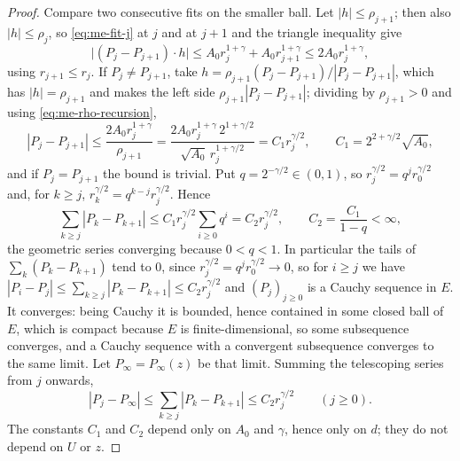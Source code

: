\begin{proof}
Compare two consecutive fits on the smaller ball. Let $|h|\le\rho_{j+1}$; then
also $|h|\le\rho_j$, so \eqref{eq:me-fit-j} at $j$ and at $j+1$ and the
triangle inequality give
\[
  \bigl|(P_j-P_{j+1})\cdot h\bigr|
   \le A_0r_j^{1+\gamma}+A_0r_{j+1}^{1+\gamma}\le2A_0r_j^{1+\gamma},
\]
using $r_{j+1}\le r_j$. If $P_j\ne P_{j+1}$, take
$h=\rho_{j+1}(P_j-P_{j+1})/|P_j-P_{j+1}|$, which has $|h|=\rho_{j+1}$ and makes
the left side $\rho_{j+1}|P_j-P_{j+1}|$; dividing by $\rho_{j+1}>0$ and using
\eqref{eq:me-rho-recursion},
\begin{equation}\label{eq:me-consecutive}
  |P_j-P_{j+1}|\le\frac{2A_0r_j^{1+\gamma}}{\rho_{j+1}}
   =\frac{2A_0r_j^{1+\gamma}\,2^{1+\gamma/2}}{\sqrt{A_0}\,r_j^{1+\gamma/2}}
   =C_1r_j^{\gamma/2},\qquad C_1=2^{2+\gamma/2}\sqrt{A_0},
\end{equation}
and if $P_j=P_{j+1}$ the bound is trivial. Put $q=2^{-\gamma/2}\in(0,1)$, so
$r_j^{\gamma/2}=q^jr_0^{\gamma/2}$ and, for $k\ge j$,
$r_k^{\gamma/2}=q^{k-j}r_j^{\gamma/2}$. Hence
\[
  \sum_{k\ge j}|P_k-P_{k+1}|
   \le C_1r_j^{\gamma/2}\sum_{i\ge0}q^i=C_2r_j^{\gamma/2},
  \qquad C_2=\frac{C_1}{1-q}<\infty ,
\]
the geometric series converging because $0<q<1$. In particular the tails of
$\sum_k(P_k-P_{k+1})$ tend to $0$, since $r_j^{\gamma/2}=q^jr_0^{\gamma/2}\to0$,
so for $i\ge j$ we have
$|P_i-P_j|\le\sum_{k\ge j}|P_k-P_{k+1}|\le C_2r_j^{\gamma/2}$ and $(P_j)_{j\ge0}$
is a Cauchy sequence in $E$. It converges: being Cauchy it is bounded, hence
contained in some closed ball of $E$, which is compact because $E$ is
finite-dimensional, so some subsequence converges, and a Cauchy sequence with a
convergent subsequence converges to the same limit. Let $P_\infty=P_\infty(z)$ be
that limit. Summing the telescoping series from $j$ onwards,
\begin{equation}\label{eq:me-slope-tail}
  |P_j-P_\infty|\le\sum_{k\ge j}|P_k-P_{k+1}|\le C_2r_j^{\gamma/2}
  \qquad(j\ge0).
\end{equation}
The constants $C_1$ and $C_2$ depend only on $A_0$ and $\gamma$, hence only on
$d$; they do not depend on $U$ or $z$.


\end{proof}
